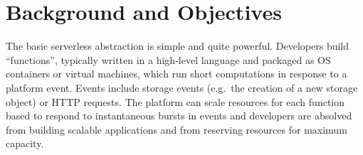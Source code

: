 \section{Background and Objectives}\label{sec:bg}

\begin{table}[]
\centering
\scriptsize
{}
\caption{Comparison with existing approaches}
\label{table:positioning}
\end{table}



The basic serverless abstraction is simple and quite powerful. Developers build
``functions'', typically written in a high-level language and packaged as OS
containers or virtual machines, which run short computations in response to a
platform event. Events include storage events (e.g.\ the creation of a new
storage object) or HTTP requests. The platform can scale resources for each
function based to respond to instantaneous bursts in events and developers are
absolved from building scalable applications and from reserving resources for
maximum capacity.

